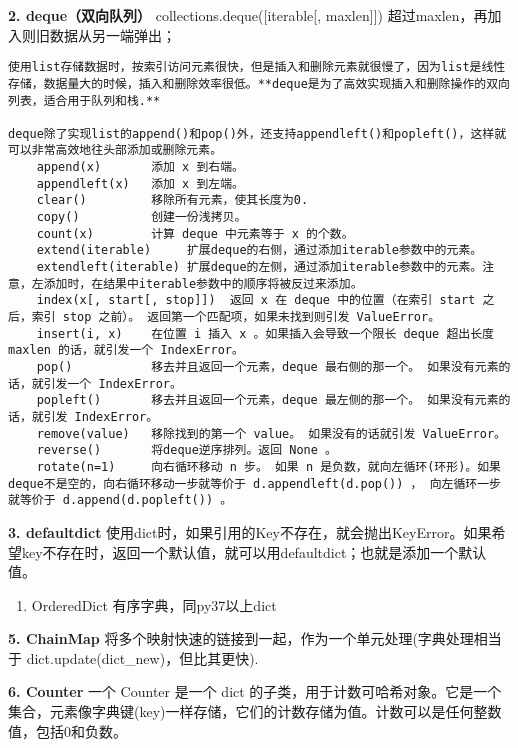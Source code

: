 \documentclass[11pt]{article}
\providecommand{\tightlist}{%
      \setlength{\itemsep}{0pt}\setlength{\parskip}{0pt}}
\begin{document}
\textbf{2. deque（双向队列）} collections.deque({[}iterable{[},
maxlen{]}{]}) 超过maxlen，再加入则旧数据从另一端弹出；

\begin{verbatim}
使用list存储数据时，按索引访问元素很快，但是插入和删除元素就很慢了，因为list是线性存储，数据量大的时候，插入和删除效率很低。**deque是为了高效实现插入和删除操作的双向列表，适合用于队列和栈.**
 
deque除了实现list的append()和pop()外，还支持appendleft()和popleft()，这样就可以非常高效地往头部添加或删除元素。
    append(x)       添加 x 到右端。
    appendleft(x)   添加 x 到左端。
    clear()         移除所有元素，使其长度为0.
    copy()          创建一份浅拷贝。
    count(x)        计算 deque 中元素等于 x 的个数。
    extend(iterable)     扩展deque的右侧，通过添加iterable参数中的元素。
    extendleft(iterable) 扩展deque的左侧，通过添加iterable参数中的元素。注意，左添加时，在结果中iterable参数中的顺序将被反过来添加。
    index(x[, start[, stop]])  返回 x 在 deque 中的位置（在索引 start 之后，索引 stop 之前）。 返回第一个匹配项，如果未找到则引发 ValueError。
    insert(i, x)    在位置 i 插入 x 。如果插入会导致一个限长 deque 超出长度 maxlen 的话，就引发一个 IndexError。
    pop()           移去并且返回一个元素，deque 最右侧的那一个。 如果没有元素的话，就引发一个 IndexError。
    popleft()       移去并且返回一个元素，deque 最左侧的那一个。 如果没有元素的话，就引发 IndexError。
    remove(value)   移除找到的第一个 value。 如果没有的话就引发 ValueError。
    reverse()       将deque逆序排列。返回 None 。
    rotate(n=1)     向右循环移动 n 步。 如果 n 是负数，就向左循环(环形)。如果deque不是空的，向右循环移动一步就等价于 d.appendleft(d.pop()) ， 向左循环一步就等价于 d.append(d.popleft()) 。
\end{verbatim}

\textbf{3. defaultdict}
使用dict时，如果引用的Key不存在，就会抛出KeyError。如果希望key不存在时，返回一个默认值，就可以用defaultdict；也就是添加一个默认值。

\begin{enumerate}
\def\labelenumi{\arabic{enumi}.}
\setcounter{enumi}{3}
\tightlist
\item
  OrderedDict 有序字典，同py37以上dict
\end{enumerate}

\textbf{5. ChainMap}
将多个映射快速的链接到一起，作为一个单元处理(字典处理相当于
dict.update(dict\_new)，但比其更快).

\textbf{6. Counter} 一个 Counter 是一个 dict
的子类，用于计数可哈希对象。它是一个集合，元素像字典键(key)一样存储，它们的计数存储为值。计数可以是任何整数值，包括0和负数。
\end{document}
